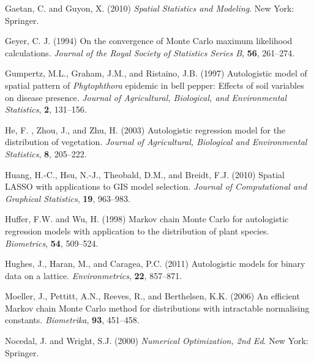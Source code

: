 \documentclass[authoryear,review, 12pt]{elsarticle}
\begin{document}
\begin{thebibliography}{00}
 Gaetan, C. and Guyon, X. (2010) \textit{Spatial Statistics and Modeling}. New York: Springer.

 Geyer, C. J. (1994) On the convergence of {M}onte {C}arlo maximum likelihood calculations. \textit{Journal of the Royal Society of Statistics Series B}, \textbf{56}, 261--274.

 Gumpertz, M.L., Graham, J.M., and Ristaino, J.B. (1997) Autologistic model of spatial pattern of \textit{Phytophthora} epidemic in bell pepper: {E}ffects of soil variables on disease presence. \textit{Journal of Agricultural, Biological, and Environmental Statistics}, \textbf{2}, 131--156.


 He, F. , Zhou, J., and Zhu, H. (2003) Autologistic regression model for the distribution of vegetation. \textit{Journal of Agricultural, Biological and Environmental Statistics}, \textbf{8}, 205--222.

 Huang, H.-C., Hsu, N.-J., Theobald, D.M., and Breidt, F.J. (2010) Spatial {LASSO} with applications to {GIS} model selection. \textit{Journal of Computational and Graphical Statistics}, \textbf{19}, 963--983.

 Huffer, F.W. and Wu, H. (1998) Markov chain {M}onte {C}arlo for autologistic regression models with application to the distribution of plant species. \textit{Biometrics}, \textbf{54}, 509--524.

 Hughes, J., Haran, M., and Caragea, P.C. (2011) Autologistic models for binary data on a lattice. \textit{Environmetrics}, \textbf{22},  857--871.

 Moeller, J., Pettitt, A.N., Reeves, R., and Berthelsen, K.K. (2006) An efficient {M}arkov chain {M}onte {C}arlo method for distributions with intractable normalising constants. \textit{Biometrika}, \textbf{93}, 451--458.

 Nocedal, J. and Wright, S.J. (2000) \textit{Numerical Optimization, 2nd Ed}. New York: Springer.



\end{thebibliography}
\end{document}

